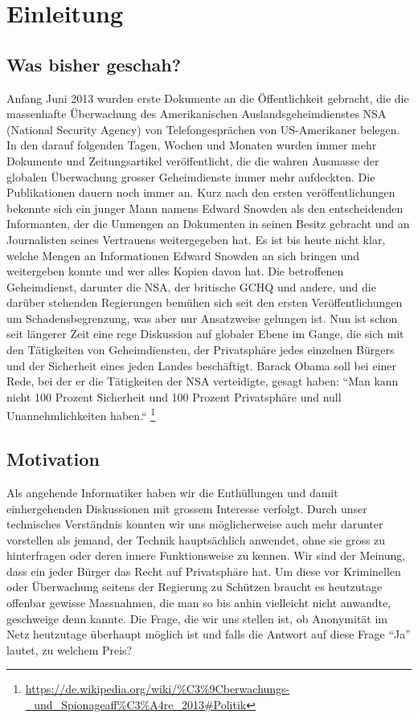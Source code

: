 \newpage
\section{Einleitung}

\subsection{Was bisher geschah?}
Anfang Juni 2013 wurden erste Dokumente an die Öffentlichkeit gebracht, die die massenhafte Überwachung des Amerikanischen Auslandsgeheimdienstes NSA (National Security Agency) von Telefongesprächen von US-Amerikaner belegen. In den darauf folgenden Tagen, Wochen und Monaten wurden immer mehr Dokumente und Zeitungsartikel veröffentlicht, die die wahren Ausmasse der globalen Überwachung grosser Geheimdienste immer mehr aufdeckten. Die Publikationen dauern noch immer an. Kurz nach den ersten veröffentlichungen bekennte sich ein junger Mann namens Edward Snowden als den entscheidenden Informanten, der die Unmengen an Dokumenten in seinen Besitz gebracht und an Journalisten seines Vertrauens weitergegeben hat. Es ist bis heute nicht klar, welche Mengen an Informationen Edward Snowden an sich bringen und weitergeben konnte und wer alles Kopien davon hat. Die betroffenen Geheimdienst, darunter die NSA, der britische GCHQ und andere, und die darüber stehenden Regierungen bemühen sich seit den ersten Veröffentlichungen um Schadensbegrenzung, was aber nur Ansatzweise gelungen ist. Nun ist schon seit längerer Zeit eine rege Diskussion auf globaler Ebene im Gange, die sich mit den Tätigkeiten von Geheimdiensten, der Privatsphäre jedes einzelnen Bürgers und der Sicherheit eines jeden Landes beschäftigt. Barack Obama soll bei einer Rede, bei der er die Tätigkeiten der NSA verteidigte, gesagt haben: ``Man kann nicht 100 Prozent Sicherheit und 100 Prozent Privatsphäre und null Unannehmlichkeiten haben.“
\footnote{\url{https://de.wikipedia.org/wiki/\%C3\%9Cberwachungs-_und_Spionageaff\%C3\%A4re_2013\#Politik}}

\subsection{Motivation}
Als angehende Informatiker haben wir die Enthüllungen und damit einhergehenden Diskussionen mit grossem Interesse verfolgt. Durch unser technisches Verständnis konnten wir uns möglicherweise auch mehr darunter vorstellen als jemand, der Technik hauptsächlich anwendet, ohne sie gross zu hinterfragen oder deren innere Funktionsweise zu kennen. Wir sind der Meinung, dass ein jeder Bürger das Recht auf Privatsphäre hat. Um diese vor Kriminellen oder Überwachung seitens der Regierung zu Schützen braucht es heutzutage offenbar gewisse Massnahmen, die man so bis anhin vielleicht nicht anwandte, geschweige denn kannte. Die Frage, die wir uns stellen ist, ob Anonymität im Netz heutzutage überhaupt möglich ist und falls die Antwort auf diese Frage ``Ja'' lautet, zu welchem Preis? 


